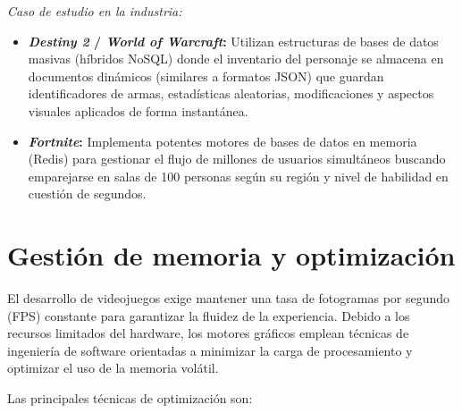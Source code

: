 \documentclass[12pt]{report}
\begin{document}
\textit{Caso de estudio en la industria:}
\begin{itemize}
    \item \textbf{\textit{Destiny 2} / \textit{World of Warcraft}:} Utilizan estructuras de bases de datos masivas (híbridos NoSQL) donde el inventario del personaje se almacena en documentos dinámicos (similares a formatos JSON) que guardan identificadores de armas, estadísticas aleatorias, modificaciones y aspectos visuales aplicados de forma instantánea.
    \item \textbf{\textit{Fortnite}:} Implementa potentes motores de bases de datos en memoria (Redis) para gestionar el flujo de millones de usuarios simultáneos buscando emparejarse en salas de 100 personas según su región y nivel de habilidad en cuestión de segundos.
\end{itemize}

\section{Gestión de memoria y optimización}

El desarrollo de videojuegos exige mantener una tasa de fotogramas por segundo (FPS) constante para garantizar la fluidez de la experiencia. Debido a los recursos limitados del hardware, los motores gráficos emplean técnicas de ingeniería de software orientadas a minimizar la carga de procesamiento y optimizar el uso de la memoria volátil.

Las principales técnicas de optimización son:
\end{document}
